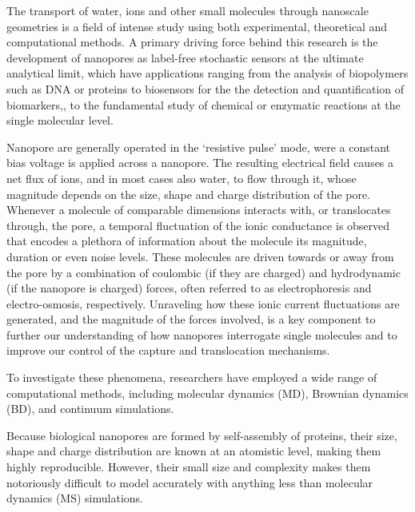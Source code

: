 \documentclass[journal=ancac3,manuscript=article,etalmode=truncate,maxauthors=0,layout=twocolumn]{achemso}
\begin{document}
The transport of water, ions and other small molecules through nanoscale geometries is a field of intense 
study using both experimental, theoretical and computational methods.\cite{Sparreboom-2010,Bocquet-2010,
Maffeo-2012,Thomas-2014,Wang-2014,Kim-2015} A primary driving force behind this research is the development 
of nanopores as label-free stochastic sensors at the ultimate analytical limit,\cite{Bayley-2001,Dekker-2007,
Venkatesan-2011,Zhang-2016} which have applications ranging from the analysis of biopolymers such as 
DNA\cite{Deamer-2016} or proteins\cite{Restrepo-Perez-2018} to biosensors for the the detection and 
quantification of biomarkers,\cite{Soskine-2012,VanMeervelt-2014,Huang-2017,Chen-2013}, to the fundamental 
study of chemical or enzymatic reactions at the single molecular level.\cite{Willems-VanMeervelt-2017,
Laszlo-2017}

Nanopore are generally operated in the `resistive pulse' mode, were a constant bias voltage is applied across 
a nanopore. The resulting electrical field causes a net flux of ions, and in most cases also water, to flow 
through it, whose magnitude depends on the size, shape and charge distribution of the pore. Whenever a 
molecule of comparable dimensions interacts with, or translocates through, the pore, a temporal fluctuation 
of the ionic conductance is observed that encodes a plethora of information about the molecule its magnitude, 
duration or even noise levels. These molecules are driven towards or away from the pore by a combination of 
coulombic (if they are charged) and hydrodynamic (if the nanopore is charged) forces, often referred to as 
electrophoresis and electro-osmosis, respectively. Unraveling how these ionic current fluctuations are 
generated, and the magnitude of the forces involved, is a key component to further our understanding of how 
nanopores interrogate single molecules and to improve our control of the capture and translocation mechanisms.

To investigate these phenomena, researchers have employed a wide range of computational methods, including 
molecular dynamics (MD), Brownian dynamics (BD), and continuum simulations.



Because biological nanopores are formed by self-assembly of proteins, their size, shape and charge 
distribution are known at an atomistic level, making them highly reproducible. However, their small size and 
complexity makes them notoriously difficult to model accurately with anything less than molecular dynamics 
(MS) simulations.
\end{document}
